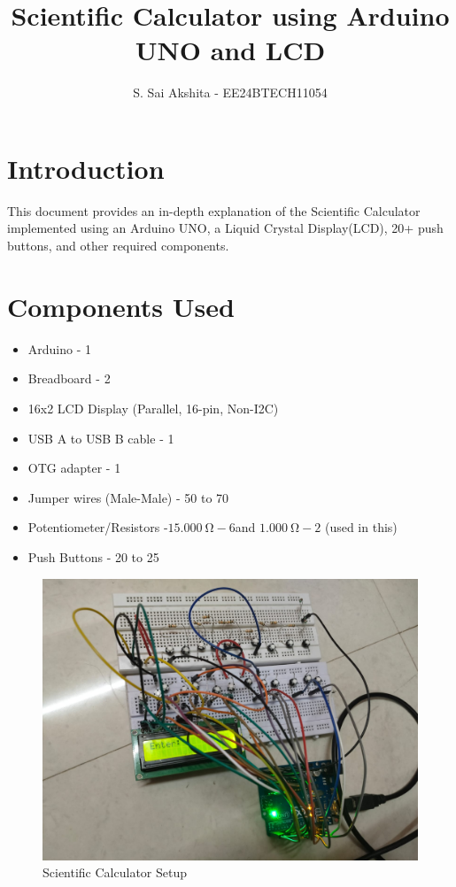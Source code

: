 \documentclass[a4paper,12pt]{article}
\title{Scientific Calculator using Arduino UNO and LCD}
\author{S. Sai Akshita - EE24BTECH11054}
\theoremstyle{remark}
\begin{document}
\maketitle

\renewcommand{\thefigure}{\theenumi}
\renewcommand{\thetable}{\theenumi}



\section{Introduction}
This document provides an in-depth explanation of the Scientific Calculator implemented using an Arduino UNO, a Liquid Crystal Display(LCD), 20+ push buttons, and other required components.

\section{Components Used}

\begin{itemize}
    \item Arduino - 1  
    \item Breadboard - 2  
    \item 16x2 LCD Display (Parallel, 16-pin, Non-I2C)
    \item USB A to USB B cable - 1  
    \item OTG adapter - 1  
    \item Jumper wires (Male-Male) - 50 to 70  
    \item Potentiometer/Resistors -$\SI{15,000}{\ohm} - 6  $and $\SI{1,000}{\ohm} - 2$ (used in this) 
    \item Push Buttons - 20 to 25  
\end{itemize}

\begin{figure}[h]
    \centering
    \includegraphics[width=0.8\columnwidth]{figs/fig1.jpeg} %
    \caption{Scientific Calculator Setup}
    \label{fig:example}
\end{figure}
\end{document}
